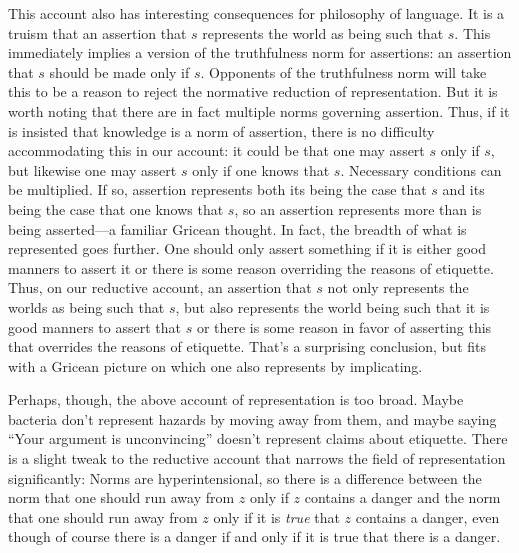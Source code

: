 This account also has interesting consequences for philosophy of language. It is a truism that an assertion that 
$s$ represents the world as being such that $s$. This immediately implies a version of the truthfulness norm
for assertions: an assertion that $s$ should be made only if $s$. Opponents of the truthfulness norm 
will take this to be a reason to reject the normative reduction of representation. But it is worth noting
that there are in fact multiple norms governing assertion. Thus, if it is insisted that knowledge is a norm
of assertion, there is no difficulty accommodating this in our account: it could be that one may 
assert $s$ only if $s$, but likewise one may assert $s$ only if one knows that $s$. Necessary conditions
can be multiplied. If so, 
assertion represents both its being the case that $s$ and its being the case that one knows that $s$, 
so an assertion represents more than is being asserted---a familiar Gricean thought. In fact, the breadth
of what is represented goes further. One should only assert something 
if it is either good manners to assert it or there is some reason overriding the reasons of 
etiquette. Thus, on our reductive account, an assertion that $s$ not only represents the worlds as being
such that $s$, but also represents the world being such that it is good manners to assert that $s$ or 
there is some reason in favor of asserting this that overrides the reasons of etiquette. That's a 
surprising conclusion, but fits with a Gricean picture on which one also represents by implicating.

Perhaps, though, the above account of representation is too broad. Maybe bacteria don't represent hazards by 
moving away from them, and maybe saying ``Your argument is unconvincing'' doesn't represent claims about etiquette.
There is a slight tweak to the reductive account that narrows the field of representation significantly:
Norms are hyperintensional, so there is a difference between the norm that one should run away from $z$ only if
$z$ contains a danger and the norm that one should run away from $z$ only if it is \textit{true} that $z$ contains 
a danger, even though of course there is a danger if and only if it is true that there is a danger.

